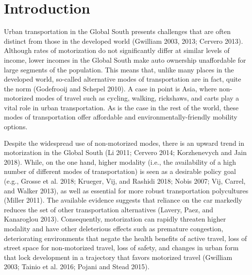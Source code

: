 \documentclass[]{elsarticle} %
\begin{document}
\hypertarget{introduction}{%
\section{Introduction}\label{introduction}}

Urban transportation in the Global South presents challenges that are
often distinct from those in the developed world (Gwilliam 2003, 2013;
Cervero 2013). Although rates of motorization do not significantly
differ at similar levels of income, lower incomes in the Global South
make auto ownership unaffordable for large segments of the population.
This means that, unlike many places in the developed world, so-called
alternative modes of transportation are in fact, quite the norm
(Godefrooij and Schepel 2010). A case in point is Asia, where
non-motorized modes of travel such as cycling, walking, rickshaws, and
carts play a vital role in urban transportation. As is the case in the
rest of the world, these modes of transportation offer affordable and
environmentally-friendly mobility options.

Despite the widespread use of non-motorized modes, there is an upward
trend in motorization in the Global South (Li 2011; Cervero 2014;
Korzhenevych and Jain 2018). While, on the one hand, higher modality
(i.e., the availability of a high number of different modes of
transportation) is seen as a desirable policy goal (e.g., Grosse et al.
2018; Krueger, Vij, and Rashidi 2018; Nobis 2007; Vij, Carrel, and
Walker 2013), as well as essential for more robust transportation
polycultures (Miller 2011). The available evidence suggests that
reliance on the car markedly reduces the set of other transportation
alternatives (Lavery, Paez, and Kanaroglou 2013). Consequently,
motorization can rapidly threaten higher modality and have other
deleterious effects such as premature congestion, deteriorating
environments that negate the health benefits of active travel, loss of
street space for non-motorized travel, loss of safety, and changes in
urban form that lock development in a trajectory that favors motorized
travel (Gwilliam 2003; Tainio et al. 2016; Pojani and Stead 2015).
\end{document}
